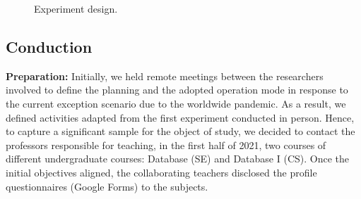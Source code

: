 \begin{figure}[!htb]
    \centering
    \caption{Experiment design.}
    \label{fig:designExp}
    
\end{figure}

\subsection{Conduction}
\label{ssec_experiments:preliminary_conduction}

\textbf{Preparation:} 
Initially, we held remote meetings between the researchers involved to define the planning and the adopted operation mode in response to the current exception scenario due to the worldwide pandemic.
As a result, we defined activities adapted from the first experiment conducted in person.
Hence, to capture a significant sample for the object of study, we decided to contact the professors responsible for teaching, in the first half of 2021, two courses of different undergraduate courses: Database (SE) and Database I (CS).
Once the initial objectives aligned, the collaborating teachers disclosed the profile questionnaires (Google Forms) to the subjects.

